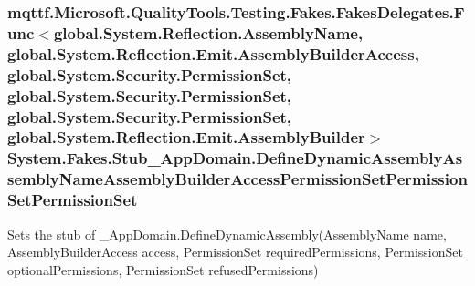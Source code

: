 \hypertarget{class_system_1_1_fakes_1_1_stub___app_domain_a43ba2c254f8dd038ee09af9c63c5da2a}{
\subsubsection[{Define\-Dynamic\-Assembly\-Assembly\-Name\-Assembly\-Builder\-Access\-Permission\-Set\-Permission\-Set\-Permission\-Set}]{\setlength{\rightskip}{0pt plus 5cm}mqttf.\-Microsoft.\-Quality\-Tools.\-Testing.\-Fakes.\-Fakes\-Delegates.\-Func$<$global.\-System.\-Reflection.\-Assembly\-Name, global.\-System.\-Reflection.\-Emit.\-Assembly\-Builder\-Access, global.\-System.\-Security.\-Permission\-Set, global.\-System.\-Security.\-Permission\-Set, global.\-System.\-Security.\-Permission\-Set, global.\-System.\-Reflection.\-Emit.\-Assembly\-Builder$>$ System.\-Fakes.\-Stub\-\_\-\-App\-Domain.\-Define\-Dynamic\-Assembly\-Assembly\-Name\-Assembly\-Builder\-Access\-Permission\-Set\-Permission\-Set\-Permission\-Set}}\label{class_system_1_1_fakes_1_1_stub___app_domain_a43ba2c254f8dd038ee09af9c63c5da2a}


Sets the stub of \-\_\-\-App\-Domain.\-Define\-Dynamic\-Assembly(\-Assembly\-Name name, Assembly\-Builder\-Access access, Permission\-Set required\-Permissions, Permission\-Set optional\-Permissions, Permission\-Set refused\-Permissions)

